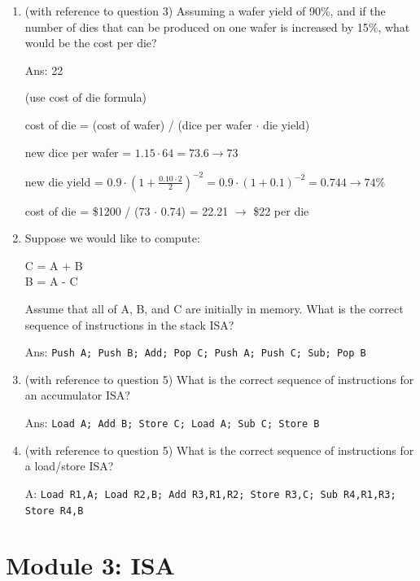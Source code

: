 \documentclass[12pt]{article}
\begin{document}
\begin{enumerate}
        \item (with reference to question 3) Assuming a wafer yield of 90\%, and if the number of dies that can be produced 
        on one wafer is increased by 15\%, what would be the cost per die?

        Ans: 22

        (use cost of die formula)

        cost of die = (cost of wafer) / (dice per wafer $\cdot$ die yield)

        new dice per wafer = $1.15 \cdot 64 = 73.6 \longrightarrow 73$

        new die yield = $0.9 \cdot (1 + \frac{0.10 \cdot 2}{2})^{-2} = 0.9 \cdot (1 + 0.1)^{-2} = 0.744 \longrightarrow 74\%$

        cost of die = \$1200 / (73 $\cdot$ 0.74) = 22.21 $\longrightarrow$ \$22 per die

        \item Suppose we would like to compute:
        
        C = A + B\\
        B = A - C

        Assume that all of A, B, and C are initially in memory. What is the correct sequence of instructions in the stack ISA?

        Ans: \texttt{Push A; Push B; Add; Pop C; Push A; Push C; Sub; Pop B}

        \item (with reference to question 5) What is the correct sequence of instructions for an accumulator ISA?
        
        Ans: \texttt{Load A; Add B; Store C; Load A; Sub C; Store B}

        \item (with reference to question 5) What is the correct sequence of instructions for a load/store ISA?
        
        A: \texttt{Load R1,A; Load R2,B; Add R3,R1,R2; Store R3,C; Sub R4,R1,R3; Store R4,B}

    \end{enumerate}

    \section{Module 3: ISA}
\end{document}
